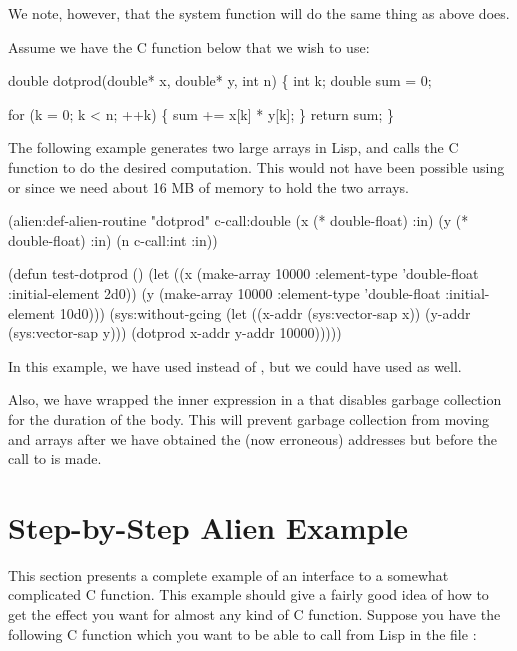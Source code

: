 We note, however, that the system function
 will do the same thing as above does.

Assume we have the C function below that we wish to use:

\begin{example}
  double dotprod(double* x, double* y, int n)
  \{
    int k;
    double sum = 0;

    for (k = 0; k < n; ++k) \{
      sum += x[k] * y[k];
    \}
    return sum;
  \}
\end{example}

The following example generates two large arrays in Lisp, and calls the C
function to do the desired computation.  This would not have been
possible using  or  since we need about
16 MB of memory to hold the two arrays.

\begin{example}
  (alien:def-alien-routine "dotprod" c-call:double
    (x (* double-float) :in)
    (y (* double-float) :in)
    (n c-call:int :in))
    
  (defun test-dotprod ()
    (let ((x (make-array 10000 :element-type 'double-float :initial-element 2d0))
          (y (make-array 10000 :element-type 'double-float :initial-element 10d0)))
        (sys:without-gcing
          (let ((x-addr (sys:vector-sap x))
                (y-addr (sys:vector-sap y)))
            (dotprod x-addr y-addr 10000)))))
\end{example}

In this example, we have used  instead of
, but we could have used  as well.

Also, we have wrapped the inner  expression in a
 that disables garbage collection for the
duration of the body.  This will prevent garbage collection from
moving  and  arrays after we have obtained the (now
erroneous) addresses but before the call to  is made.


\section{Step-by-Step Alien Example}

This section presents a complete example of an interface to a somewhat
complicated C function.  This example should give a fairly good idea
of how to get the effect you want for almost any kind of C function.
Suppose you have the following C function which you want to be able to
call from Lisp in the file :

